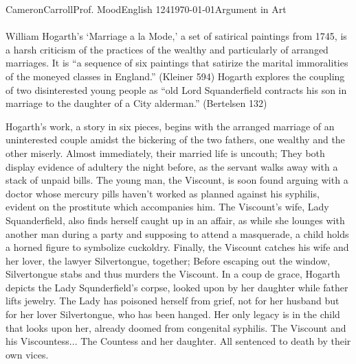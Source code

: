 \documentclass[12pt,letterpaper]{article}
\begin{document}
\begin{mla}{Cameron}{Carroll}{Prof. Mood}{English 124}{\today}{Argument in Art}

\begin{abstract}
 Given the sanitation and medicinal shortcomings of the eighteenth century, moral instruction served a greater purpose than simply keeping one's conscience clean; Rather, morals and moral-based stories served and continue to serve as the boundaries of personal health and safety. William Hogarth, in his sextuplet work, argues against myriad moral issues and vices but focusing on lust and gluttony. Throughout the story, each character's vices ultimately bring about their poor fortune, which is Hogarth's vehicle of argument: Suffering.
\end{abstract}


\paragraph{} William Hogarth's `Marriage a la Mode,'  a set of satirical paintings from 1745, is a harsh criticism of the practices of the wealthy and particularly of arranged marriages. It is ``a sequence of six paintings that satirize the marital immoralities of the moneyed classes in England.'' (Kleiner 594) Hogarth explores the coupling of two disinterested young people as ``old Lord Squanderfield contracts his son in marriage to the daughter of a City alderman.'' (Bertelsen 132) 

Hogarth's work, a story in six pieces, begins with the arranged marriage of an uninterested couple amidst the bickering of the two fathers, one wealthy and the other miserly. Almost immediately, their married life is uncouth; They both display evidence of adultery the night before, as the servant walks away with a stack of unpaid bills. The young man, the Viscount, is soon found arguing with a doctor whose mercury pills haven't worked as planned against his syphilis, evident on the prostitute which accompanies him. The Viscount's wife, Lady Squanderfield, also finds herself caught up in an affair, as while she lounges with another man during a party and supposing to attend a masquerade, a child holds a horned figure to symbolize cuckoldry. Finally, the Viscount catches his wife and her lover, the lawyer Silvertongue, together; Before escaping out the window, Silvertongue stabs and thus murders the Viscount. In a coup de grace, Hogarth depicts the Lady Squnderfield's corpse, looked upon by her daughter while father lifts jewelry. The Lady has poisoned herself from grief, not for her husband but for her lover Silvertongue, who has been hanged. Her only legacy is in the child that looks upon her, already doomed from congenital syphilis. The Viscount and his Viscountess... The Countess and her daughter.  All sentenced to death by their own vices.




\end{mla}
\end{document}
